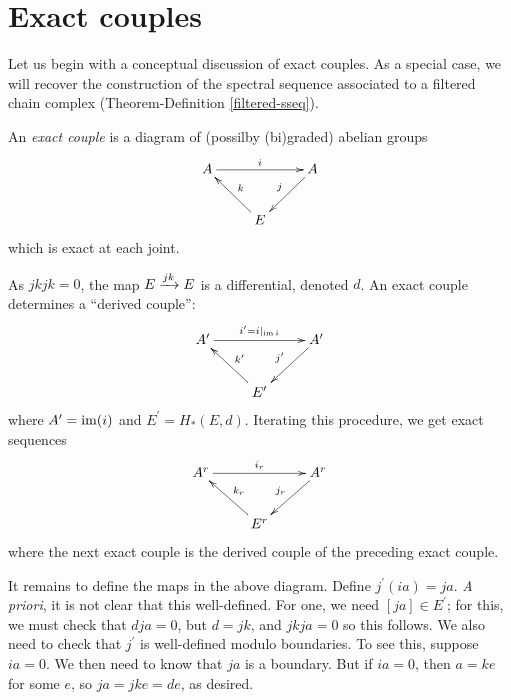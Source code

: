\section{Exact couples}
Let us begin with a conceptual discussion of exact couples. As a special case,
we will recover the construction of the spectral sequence associated to a
filtered chain complex (Theorem-Definition \ref{filtered-sseq}).
\begin{definition}
    An \emph{exact couple} is a diagram of (possilby (bi)graded) abelian
    groups
    \begin{equation*}
	\xymatrix{
	    A\ar[rr]^i & & A\ar[dl]_j\\
	    & E\ar[ul]_k & 
	    }
    \end{equation*}
    which is exact at each joint.
\end{definition}
As $jkjk = 0$, the map $E\xrightarrow{{jk}} E$ is a differential, denoted $d$. An exact
couple determines a ``derived couple'':
\begin{equation}\label{derived-couple}
    \xymatrix{
	A^\prime\ar[rr]^{i^\prime = i|_{\img i}} & &
	A^\prime\ar[dl]_{j^\prime}\\
	& E^\prime\ar[ul]_{k^\prime} & 
        }
\end{equation}
where $A^\prime = \operatorname{im}(i)$ and $E^\prime = H_\ast(E,d)$. Iterating this
procedure, we get exact sequences 
\begin{equation*}
    \xymatrix{
	A^r\ar[rr]^{i_r} & & A^r\ar[dl]_{j_r}\\
	& E^r\ar[ul]_{k_r} & 
        }
\end{equation*}
where the next exact couple is the derived couple of the preceding exact
couple.

It remains to define the maps in the above diagram. Define $j^\prime(ia) = ja$.
\emph{A priori}, it is not clear that this well-defined. For one, we need $[ja]
\in E^\prime$; for this, we must check that $dja = 0$, but $d=jk$, and $jkja =
0$ so this follows. We also need to check that $j^\prime$ is well-defined
modulo boundaries. To see this, suppose $ia = 0$. We then need to know that
$ja$ is a boundary. But if $ia = 0$, then $a = ke$ for some $e$, so $ja = jke =
de$, as desired.

